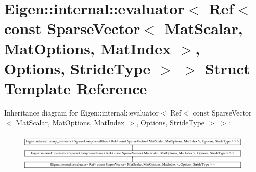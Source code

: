 \hypertarget{struct_eigen_1_1internal_1_1evaluator_3_01_ref_3_01const_01_sparse_vector_3_01_mat_scalar_00_01_a519c1c897a6ea04f0cfeb49f9a37d05}{}\section{Eigen\+::internal\+::evaluator$<$ Ref$<$ const Sparse\+Vector$<$ Mat\+Scalar, Mat\+Options, Mat\+Index $>$, Options, Stride\+Type $>$ $>$ Struct Template Reference}
\label{struct_eigen_1_1internal_1_1evaluator_3_01_ref_3_01const_01_sparse_vector_3_01_mat_scalar_00_01_a519c1c897a6ea04f0cfeb49f9a37d05}
Inheritance diagram for Eigen\+::internal\+::evaluator$<$ Ref$<$ const Sparse\+Vector$<$ Mat\+Scalar, Mat\+Options, Mat\+Index $>$, Options, Stride\+Type $>$ $>$\+:\begin{figure}[H]
\begin{center}
\leavevmode
\includegraphics[height=1.913440cm]{struct_eigen_1_1internal_1_1evaluator_3_01_ref_3_01const_01_sparse_vector_3_01_mat_scalar_00_01_a519c1c897a6ea04f0cfeb49f9a37d05}
\end{center}
\end{figure}
